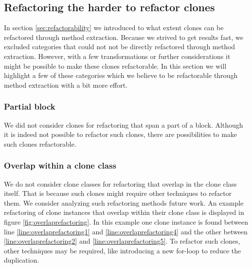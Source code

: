 \subsection{Refactoring the harder to refactor clones}
In section \ref{sec:refactorability} we introduced to what extent clones can be refactored through method extraction. Because we strived to get results fast, we excluded categories that could not not be directly refactored through method extraction. However, with a few transformations or further considerations it might be possible to make these clones refactorable. In this section we will highlight a few of these categories which we believe to be refactorable through method extraction with a bit more effort.

\subsubsection{Partial block}
We did not consider clones for refactoring that span a part of a block. Although it is indeed not possible to refactor such clones, there are possibilities to make such clones refactorable.

\subsubsection{Overlap within a clone class}
We do not consider clone classes for refactoring that overlap in the clone class itself. That is because such clones might require other techniques to refactor them. We consider analyzing such refactoring methods future work. An example refactoring of clone instances that overlap within their clone class is displayed in figure \ref{fig:overlaprefactoring}. In this example one clone instance is found between line \ref{line:overlaprefactoring1} and \ref{line:overlaprefactoring4} and the other between \ref{line:overlaprefactoring2} and \ref{line:overlaprefactoring5}. To refactor such clones, other techniques may be required, like introducing a new for-loop to reduce the duplication.


